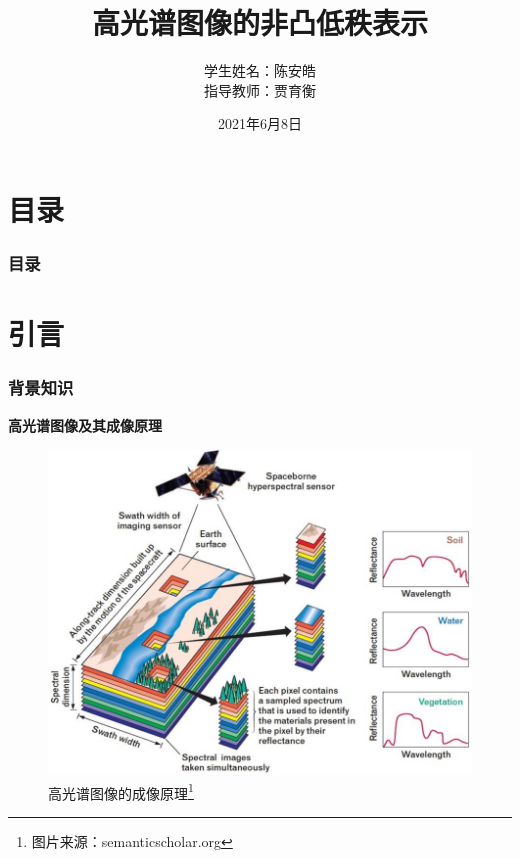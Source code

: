 \documentclass[10pt,aspectratio=43,mathserif]{beamer}
\title[高光谱图像的非凸低秩表示]{
	\fontsize{14pt}{25pt}\selectfont \textbf{高光谱图像的非凸低秩表示}
}
\subtitle{\fontsize{13pt}{14pt}\selectfont {在图像降噪方面的使用}}
\institute[SEU]{
	\fontsize{11pt}{12pt}\selectfont {东南大学{\quad}吴健雄学院}
}
\author[陈安皓]{
	学生姓名：陈安皓\\
	指导教师：贾育衡
}
\date[2021年6月8日]{
 2021年6月8日
}
\begin{document}
\begin{frame}
\titlepage
\end{frame}

\section*{目录}

\begin{frame}
\frametitle{\textbf{目录}}
\textbf{\tableofcontents}
\end{frame}

\section[引言]{引言}

\begin{frame}
\frametitle{\textbf{背景知识}}
\begin{block}{\textbf{高光谱图像及其成像原理}}
\begin{figure}[H]
\centering
\includegraphics[scale=0.22]{img-principleofphotograph.png}
\caption{高光谱图像的成像原理\footnote{图片来源：semanticscholar.org}}
\end{figure}
\end{block}
\end{frame}
    
\end{document}
